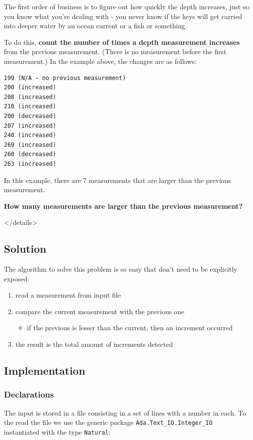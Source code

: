 \documentclass[11pt]{article}
\begin{document}
The first order of business is to figure out how quickly the depth increases,
just so you know what you're dealing with - you never know if the keys will get
carried into deeper water by an ocean current or a fish or something.

To do this, \textbf{count the number of times a depth measurement increases} from the
previous measurement. (There is no measurement before the first measurement.) In
the example above, the changes are as follows:

\begin{verbatim}
199 (N/A - no previous measurement)
200 (increased)
208 (increased)
210 (increased)
200 (decreased)
207 (increased)
240 (increased)
269 (increased)
260 (decreased)
263 (increased)
\end{verbatim}

In this example, there are 7 measurements that are larger than the previous
measurement.

\textbf{How many measurements are larger than the previous measurement?}

\begin{html}
</details>
\end{html}

\subsection{Solution}
\label{sec:orga4f5c03}
The algorithm to solve this problem is so easy that don't need to be explicitly
exposed:

\begin{enumerate}
\item read a measurement from input file
\item compare the current measurement with the previous one
\begin{itemize}
\item if the previous is lesser than the current, then an increment occurred
\end{itemize}
\item the result is the total amount of increments detected
\end{enumerate}

\subsection{Implementation}
\label{sec:org0017eed}
\subsubsection{Declarations}
\label{sec:org653fc7a}
The input is stored in a file consisting in a set of lines with a number in
each. To the read the file we use the generic package \texttt{Ada.Text\_IO.Integer\_IO}
instantiated with the type \texttt{Natural}:
\end{document}
